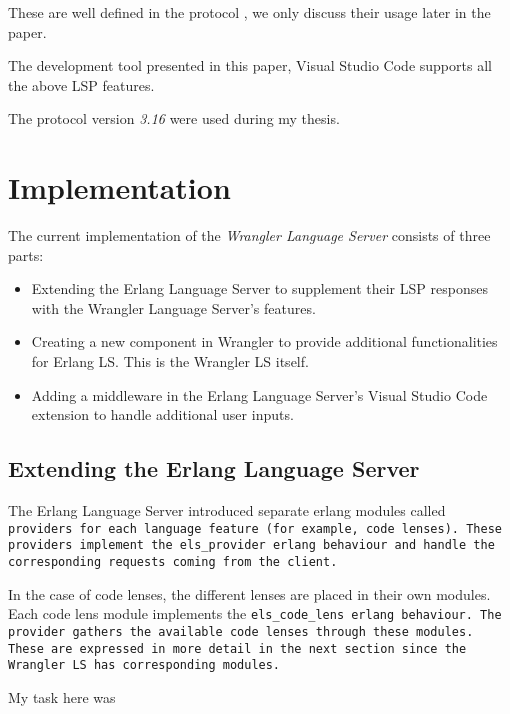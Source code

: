 These are well defined in the protocol \cite{LSP}, we only discuss their usage later in the paper.

\begin{note}
The development tool presented in this paper, Visual Studio Code supports all the above LSP features. 
\end{note}

The protocol version \emph{3.16} were used during my thesis.

\section{Implementation}

The current implementation of the \emph{Wrangler Language Server} consists of three parts:

\begin{itemize}
    \item Extending the Erlang Language Server to supplement their LSP responses with the Wrangler Language Server's features.
    \item Creating a new component in Wrangler to provide additional functionalities for Erlang LS. This is the Wrangler LS itself.
    \item Adding a middleware in the Erlang Language Server's Visual Studio Code extension to handle additional user inputs. 
\end{itemize}


\subsection{Extending the Erlang Language Server}

The Erlang Language Server introduced separate erlang modules called \tt provider\rm s for each language feature (for example, code lenses). These providers implement the \tt els\_provider\rm\ erlang behaviour and handle the corresponding requests coming from the client. 

In the case of code lenses, the different lenses are placed in their own modules. Each code lens module implements the \tt els\_code\_lens\rm\  erlang behaviour. The provider gathers the available code lenses through these modules. These are expressed in more detail in the next section since the Wrangler LS has corresponding modules. \label{src:behaviours} 

My task here was 

